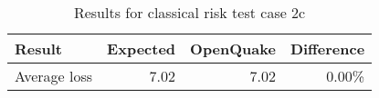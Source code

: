 \begin{table}[htbp]

\centering
\begin{tabular}{ l r r r }

\hline
\rowcolor{anti-flashwhite}
\bf{Result} & \bf{Expected} & \bf{OpenQuake} & \bf{Difference}\\
\hline
Average loss & 7.02 & 7.02 & 0.00\% \\
\hline
\end{tabular}

\caption{Results for classical risk test case 2c}
\label{tab:result-cr-2c}
\end{table}